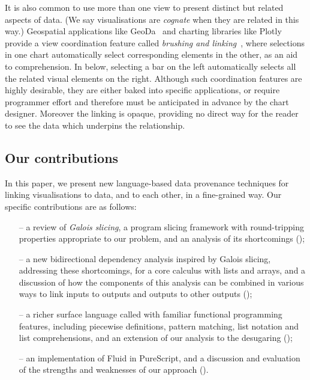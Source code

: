 It is also common to use more than one view to present distinct but related aspects of data. (We say visualisations are \emph{cognate} when they are related in this way.) Geospatial applications like GeoDa~\cite{anselin06} and charting libraries like Plotly provide a view coordination feature called \emph{brushing and linking}~\cite{becker87}, where selections in one chart automatically select corresponding elements in the other, as an aid to comprehension. In  below, selecting a bar on the left automatically selects all the related visual elements on the right. Although such coordination features are highly desirable, they are either baked into specific applications, or require programmer effort and therefore must be anticipated in advance by the chart designer. Moreover the linking is opaque, providing no direct way for the reader to see the data which underpins the relationship.

\subsection{Our contributions}

In this paper, we present new language-based data provenance techniques for linking visualisations to data, and to each other, in a fine-grained way. Our specific contributions are as follows:

\begin{itemize}[leftmargin=*]
   \item[--] a review of \emph{Galois slicing}, a program slicing framework with round-tripping properties appropriate to our problem, and an analysis of its shortcomings ();
   \item[--] a new bidirectional dependency analysis inspired by Galois slicing, addressing these shortcomings, for a core calculus with lists and arrays, and a discussion of how the components of this analysis can be combined in various ways to link inputs to outputs and outputs to other outputs ();
   \item[--] a richer surface language called \OurLanguage with familiar functional programming features, including piecewise definitions, pattern matching, list notation and list comprehensions, and an extension of our analysis to the desugaring ();
   \item[--] an implementation of Fluid in PureScript, and a discussion and evaluation of the strengths and weaknesses of our approach ().
\end{itemize}
